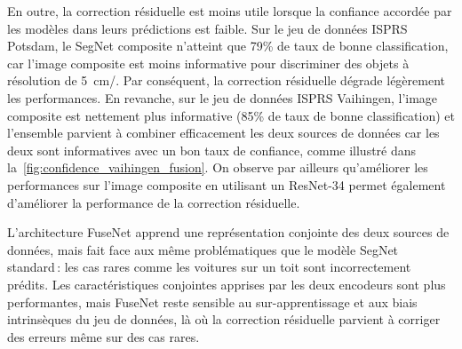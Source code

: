 En outre, la correction résiduelle est moins utile lorsque la confiance accordée par les modèles dans leurs prédictions est faible. Sur le jeu de données \gls{ISPRS} Potsdam, le SegNet composite n'atteint que 79\% de taux de bonne classification, car l'image composite est moins informative pour discriminer des objets à résolution de \SI{5}{\centi\meter/\px}. Par conséquent, la correction résiduelle dégrade légèrement les performances. En revanche, sur le jeu de données \gls{ISPRS} Vaihingen, l'image composite est nettement plus informative (85\% de taux de bonne classification) et l'ensemble parvient à combiner efficacement les deux sources de données car les deux sont informatives avec un bon taux de confiance, comme illustré dans la~\cref{fig:confidence_vaihingen_fusion}. On observe par ailleurs qu'améliorer les performances sur l'image composite en utilisant un ResNet-34 permet également d'améliorer la performance de la correction résiduelle.

L'architecture FuseNet apprend une représentation conjointe des deux sources de données, mais fait face aux même problématiques que le modèle SegNet standard\,: les cas rares comme les voitures sur un toit sont incorrectement prédits. Les caractéristiques conjointes apprises par les deux encodeurs sont plus performantes, mais FuseNet reste sensible au sur-apprentissage et aux biais intrinsèques du jeu de données, là où la correction résiduelle parvient à corriger des erreurs même sur des cas rares.


